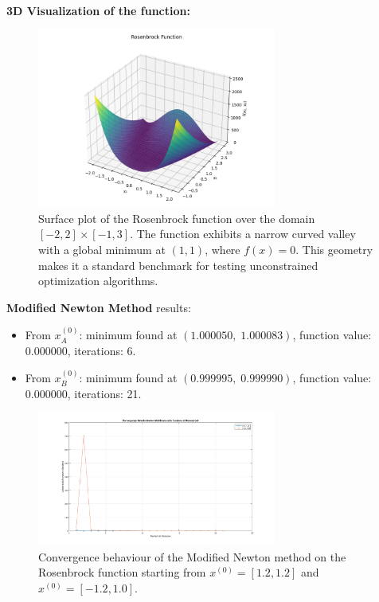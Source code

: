 \documentclass[a4paper,12pt]{article}
\begin{document}
	\textbf{3D Visualization of the function:}
	\begin{figure}[htbp]
		\centering
		\includegraphics[width=0.7\textwidth]{../immagini/rosen3D_A.png}
		\caption{Surface plot of the Rosenbrock function over the domain $[-2, 2] \times [-1, 3]$. The function exhibits a narrow curved valley with a global minimum at $(1, 1)$, where $f(x) = 0$. This geometry makes it a standard benchmark for testing unconstrained optimization algorithms.}
		
		\label{fig:rosennewton}
	\end{figure}
	\newpage
	
	\vspace{1em}
	\textbf{Modified Newton Method} results:
	\begin{itemize}
		\item From \( x^{(0)}_A \):  
		minimum found at \( (1.000050,\;1.000083) \),  
		function value: \( 0.000000 \),  
		iterations: 6.
		\item From \( x^{(0)}_B \):  
		minimum found at \( (0.999995,\;0.999990) \),  
		function value: \( 0.000000 \),  
		iterations: 21.
	\end{itemize}
	
	\begin{figure}[htbp]
		\centering
		\includegraphics[width=0.7\textwidth]{../immagini/grafrosennewton.png}
		\caption{Convergence behaviour of the Modified Newton method on the Rosenbrock function starting from $x^{(0)} = [1.2, 1.2]$ and $x^{(0)} = [-1.2, 1.0]$.}
		\label{fig:rosennewton}
	\end{figure}
	
\end{document}
